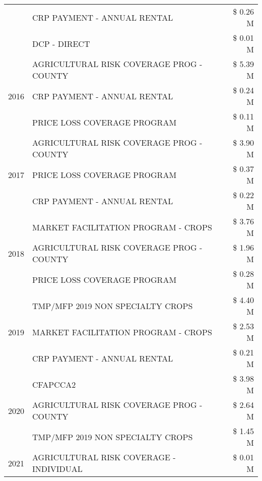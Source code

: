 \begin{tabular}{llr}
 & CRP PAYMENT - ANNUAL RENTAL & \$ 0.26 M \\
 & DCP - DIRECT & \$ 0.01 M \\
\cline{1-3}
\multirow[t]{3}{*}{2016} & AGRICULTURAL RISK COVERAGE PROG - COUNTY & \$ 5.39 M \\
 & CRP PAYMENT - ANNUAL RENTAL & \$ 0.24 M \\
 & PRICE LOSS COVERAGE PROGRAM & \$ 0.11 M \\
\cline{1-3}
\multirow[t]{3}{*}{2017} & AGRICULTURAL RISK COVERAGE PROG - COUNTY & \$ 3.90 M \\
 & PRICE LOSS COVERAGE PROGRAM & \$ 0.37 M \\
 & CRP PAYMENT - ANNUAL RENTAL & \$ 0.22 M \\
\cline{1-3}
\multirow[t]{3}{*}{2018} & MARKET FACILITATION PROGRAM - CROPS & \$ 3.76 M \\
 & AGRICULTURAL RISK COVERAGE PROG - COUNTY & \$ 1.96 M \\
 & PRICE LOSS COVERAGE PROGRAM & \$ 0.28 M \\
\cline{1-3}
\multirow[t]{3}{*}{2019} & TMP/MFP 2019 NON SPECIALTY CROPS & \$ 4.40 M \\
 & MARKET FACILITATION PROGRAM - CROPS & \$ 2.53 M \\
 & CRP PAYMENT - ANNUAL RENTAL & \$ 0.21 M \\
\cline{1-3}
\multirow[t]{3}{*}{2020} & CFAPCCA2 & \$ 3.98 M \\
 & AGRICULTURAL RISK COVERAGE PROG - COUNTY & \$ 2.64 M \\
 & TMP/MFP 2019 NON SPECIALTY CROPS & \$ 1.45 M \\
\cline{1-3}
2021 & AGRICULTURAL RISK COVERAGE - INDIVIDUAL & \$ 0.01 M \\
\cline{1-3}
\bottomrule
\end{tabular}
